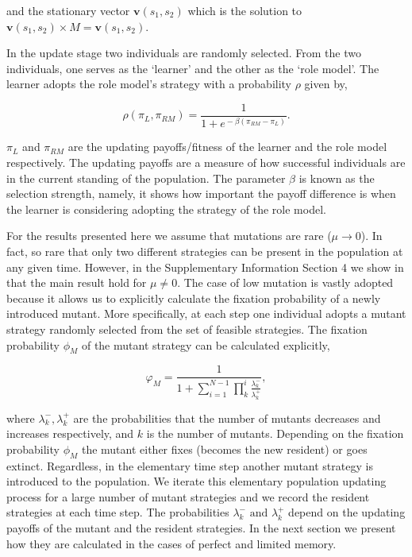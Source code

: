 \documentclass[11pt]{article}
\theoremstyle{plainCl1}
\theoremstyle{plainCl2}
\begin{document}
and the stationary vector \(\mathbf{v}(s_1,s_2)\)
which is the solution to \(\mathbf{v}(s_1,s_2) \times M 
= \mathbf{v}(s_1,s_2)\).

In the update stage two individuals are randomly selected. From the two
individuals, one  serves as the `learner' and the other as the `role model'. The
learner adopts the role model's strategy with a probability \(\rho\) given by,

\begin{equation} \label{Eq:rho}
    \rho(\pi_{L}, \pi_{RM}) = \frac{1}{1\!+\! e^{\!-\!\beta (\pi_{RM}\!-\! \pi_{L})}}.
\end{equation}

\(\pi_{L}\) and \(\pi_{RM}\) are the updating payoffs/fitness of the learner and the
role model respectively. The updating payoffs are a measure of how successful
individuals are in the current standing of the population. The parameter
\(\beta\) is known as the selection strength, namely, it shows how important the
payoff difference is when the learner is considering adopting the strategy of
the role model.

For the results presented here we assume that mutations are rare (\(\mu
\rightarrow 0\)). In fact, so rare that only two different strategies can be
present in the population at any given time. However, in the Supplementary Information
Section 4 we show in that the main result hold for \(\mu \neq 0\).
The case of low mutation is vastly adopted because it allows us to explicitly
calculate the fixation probability of a newly introduced mutant. More specifically,
at each step
one individual adopts a mutant strategy randomly selected from the set of
feasible strategies. The fixation probability \(\phi_{M}\) of the mutant
strategy can be calculated explicitly,

\begin{equation}\label{eq:appendix_fixation_probability}
    \varphi_{M} = \frac{1}{1+\sum\limits_{i=1}^{N-1}\prod\limits_k^i \frac{\lambda^-_k}{\lambda^+_k}},
\end{equation}

where \(\lambda^-_k, \lambda^+_k\) are the probabilities that the number of
mutants decreases and increases respectively, and \(k\) is the number of
mutants. Depending on the fixation probability \(\phi_{M}\) the mutant either
fixes (becomes the new resident) or goes extinct. Regardless, in the elementary
time step another mutant strategy is introduced to the population. We iterate
this elementary population updating process for a large number of mutant
strategies and we record the resident strategies at each time step. The
probabilities \(\lambda^-_k \text{ and } \lambda^+_k\) depend on the updating
payoffs of the mutant and the resident strategies. In the next section we
present how they are calculated in the cases of perfect and limited memory.
\end{document}
